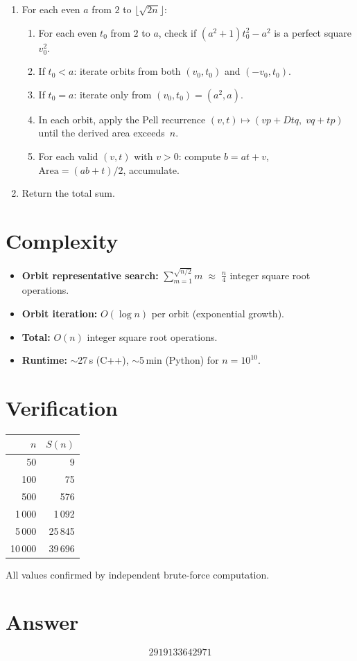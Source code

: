 \documentclass[11pt]{article}
\begin{document}
\begin{enumerate}
  \item For each even $a$ from $2$ to $\lfloor\sqrt{2n}\rfloor$:
    \begin{enumerate}
      \item For each even $t_0$ from $2$ to $a$, check if
            $(a^2+1)t_0^2 - a^2$ is a perfect square $v_0^2$.
      \item If $t_0 < a$: iterate orbits from both $(v_0, t_0)$ and $(-v_0, t_0)$.
      \item If $t_0 = a$: iterate only from $(v_0, t_0) = (a^2, a)$.
      \item In each orbit, apply the Pell recurrence
            $(v, t) \mapsto (vp + Dtq,\; vq + tp)$ until the derived area exceeds~$n$.
      \item For each valid $(v, t)$ with $v > 0$: compute
            $b = at + v$, $\text{Area} = (ab + t)/2$, accumulate.
    \end{enumerate}
  \item Return the total sum.
\end{enumerate}

\section{Complexity}

\begin{itemize}
  \item \textbf{Orbit representative search:}
        $\displaystyle\sum_{m=1}^{\sqrt{n/2}} m \;\approx\; \frac{n}{4}$
        integer square root operations.
  \item \textbf{Orbit iteration:} $O(\log n)$ per orbit (exponential growth).
  \item \textbf{Total:} $O(n)$ integer square root operations.
  \item \textbf{Runtime:} $\sim$27\,s (C++), $\sim$5\,min (Python) for $n = 10^{10}$.
\end{itemize}

\section{Verification}

\begin{center}
\begin{tabular}{rr}
\toprule
$n$ & $S(n)$ \\
\midrule
50 & 9 \\
100 & 75 \\
500 & 576 \\
1\,000 & 1\,092 \\
5\,000 & 25\,845 \\
10\,000 & 39\,696 \\
\bottomrule
\end{tabular}
\end{center}

All values confirmed by independent brute-force computation.

\section{Answer}

\[
\boxed{2919133642971}
\]
\end{document}
